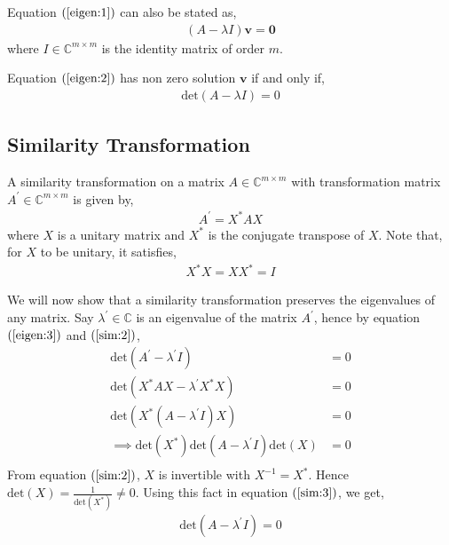 \documentclass[12pt]{article}
\numberwithin{equation}{section}
\newcommand{\vecb}[1]{\mathbf{#1}}
\newcommand{\brak}[1]{\ensuremath{\left(#1\right)}}
\newcommand{\defmat}[2]{#1\in\mathbb{C}^{#2\times#2}}
\begin{document}
Equation \brak{\ref{eigen:1}} can also be stated as,
\begin{align}
\label{eigen:2}
   \brak{A - \lambda I} \vecb{v} = \vecb{0} 
\end{align}
where $I \in \mathbb{C}^{m \times m}$ is the identity matrix of order $m$.
\newline

Equation \brak{\ref{eigen:2}} has non zero solution $\vecb{v}$ if and only if, 
\begin{align}
\label{eigen:3}
    \text{det}\brak{A - \lambda I} = 0
\end{align}

\subsection{Similarity Transformation}
A similarity transformation on a matrix $\defmat{A}{m}$ with transformation matrix $\defmat{A^{\prime}}{m}$ is given by,
\begin{align}
    A^{\prime} = X^{\ast} A X
\end{align}
where $X$ is a unitary matrix and $X^{\ast}$ is the conjugate transpose of $X$.
Note that, for $X$ to be unitary, it satisfies,
\begin{align}
    \label{sim:2}
    X^{\ast}X = XX^{\ast} = I
\end{align}

We will now show that a similarity transformation preserves the eigenvalues of any matrix.
\newline
Say $\lambda^{\prime} \in \mathbb{C}$ is an eigenvalue of the matrix $A^{\prime}$, hence by equation \brak{\ref{eigen:3}} and \brak{\ref{sim:2}},
\begin{align}
    \text{det}\brak{A^{\prime} - \lambda^{\prime} I} &= 0\\
    \text{det}\brak{X^{\ast}AX - \lambda^{\prime} X^{\ast}X} &= 0\\
    \text{det}\brak{X^{\ast}\brak{A - \lambda^{\prime}I} X} &= 0\\
    \label{sim:3} \implies \text{det}\brak{X^{\ast}} \text{det}\brak{A - \lambda^{\prime}I} \text{det}\brak{X} &= 0\\
\end{align}
From equation \brak{\ref{sim:2}}, $X$ is invertible with $X^{-1} = X^{\ast}$. Hence $\text{det} \brak{X} = \frac{1}{\text{det} \brak{X^{\ast}}}\neq 0$.
\newline
Using this fact in equation \brak{\ref{sim:3}}, we get,
\begin{align}
    \text{det}\brak{A - \lambda^{\prime} I} = 0
\end{align}
\end{document}

